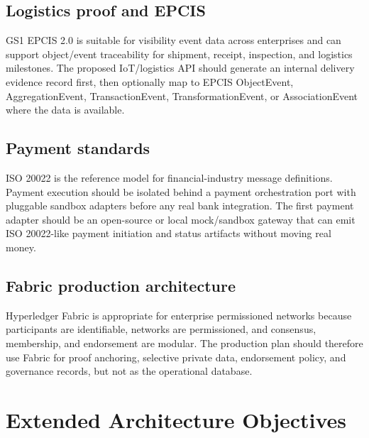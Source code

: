 \documentclass[11pt]{article}
\begin{document}
\subsection{Logistics proof and EPCIS}
GS1 EPCIS 2.0 is suitable for visibility event data across enterprises and can support object/event traceability for shipment, receipt, inspection, and logistics milestones. The proposed IoT/logistics API should generate an internal delivery evidence record first, then optionally map to EPCIS ObjectEvent, AggregationEvent, TransactionEvent, TransformationEvent, or AssociationEvent where the data is available.

\subsection{Payment standards}
ISO 20022 is the reference model for financial-industry message definitions. Payment execution should be isolated behind a payment orchestration port with pluggable sandbox adapters before any real bank integration. The first payment adapter should be an open-source or local mock/sandbox gateway that can emit ISO 20022-like payment initiation and status artifacts without moving real money.

\subsection{Fabric production architecture}
Hyperledger Fabric is appropriate for enterprise permissioned networks because participants are identifiable, networks are permissioned, and consensus, membership, and endorsement are modular. The production plan should therefore use Fabric for proof anchoring, selective private data, endorsement policy, and governance records, but not as the operational database.

\section{Extended Architecture Objectives}
\end{document}
